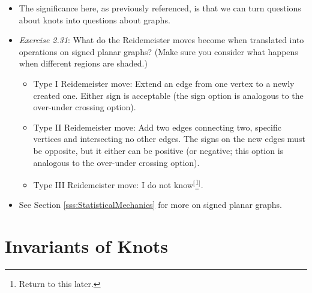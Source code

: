 \documentclass[titlepage]{article}
\numberwithin{figure}{section}
\numberwithin{table}{section}
\numberwithin{equation}{section}
\begin{document}
\begin{itemize}
\begin{itemize}
    \end{itemize}
    \item The significance here, as previously referenced, is that we can turn questions about knots into questions about graphs.
    \item \emph{Exercise 2.31}: What do the Reidemeister moves become when translated into operations on signed planar graphs? (Make sure you consider what happens when different regions are shaded.)
    \begin{itemize}
        \item Type I Reidemeister move: Extend an edge from one vertex to a newly created one. Either sign is acceptable (the sign option is analogous to the over-under crossing option).
        \item Type II Reidemeister move: Add two edges connecting two, specific vertices and intersecting no other edges. The signs on the new edges must be opposite, but it either can be positive (or negative; this option is analogous to the over-under crossing option).
        \item Type III Reidemeister move: I do not know$^[$\footnote{Return to this later.}$^]$.
    \end{itemize}
    \item See Section \ref{sss:StatisticalMechanics} for more on signed planar graphs.
\end{itemize}
\newpage



\section{Invariants of Knots}
\end{document}
